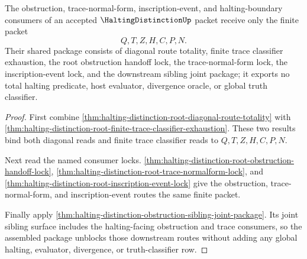\begin{theorem}
\label{thm:halting-distinction-root-downstream-unblock-package}
The obstruction, trace-normal-form, inscription-event, and halting-boundary consumers of an accepted $\HaltingDistinctionUp$ packet receive only the finite packet
$$
Q,T,Z,H,C,P,N.
$$
Their shared package consists of diagonal route totality, finite trace classifier exhaustion, the root obstruction handoff lock, the trace-normal-form lock, the inscription-event lock, and the downstream sibling joint package; it exports no total halting predicate, host evaluator, divergence oracle, or global truth classifier.
\end{theorem}
\begin{proof}
First combine \autoref{thm:halting-distinction-root-diagonal-route-totality} with \autoref{thm:halting-distinction-root-finite-trace-classifier-exhaustion}. These two results bind both diagonal reads and finite trace classifier reads to $Q,T,Z,H,C,P,N$.

Next read the named consumer locks. \autoref{thm:halting-distinction-root-obstruction-handoff-lock}, \autoref{thm:halting-distinction-root-trace-normalform-lock}, and \autoref{thm:halting-distinction-root-inscription-event-lock} give the obstruction, trace-normal-form, and inscription-event routes the same finite packet.

Finally apply \autoref{thm:halting-distinction-obstruction-sibling-joint-package}. Its joint sibling surface includes the halting-facing obstruction and trace consumers, so the assembled package unblocks those downstream routes without adding any global halting, evaluator, divergence, or truth-classifier row.
\end{proof}

